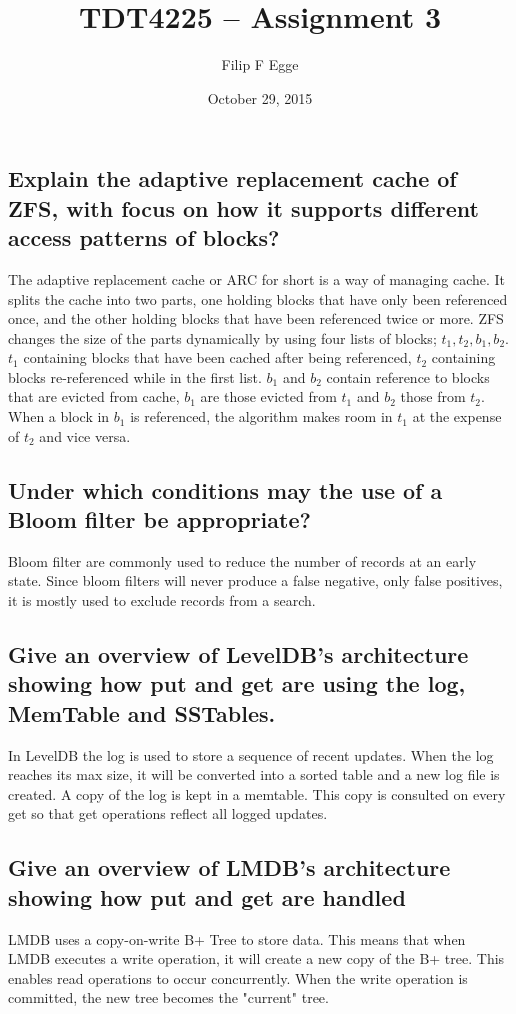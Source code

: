 \documentclass{article}
\begin{document}
 
\title{TDT4225 -- Assignment 3} 
\author{Filip F Egge}
\date{October 29, 2015} 
\maketitle

\newpage

\subsection*{Explain the adaptive replacement cache of ZFS, with focus on how
it supports different access patterns of blocks?} 
The adaptive replacement cache or ARC for short is a way of managing cache. It
splits the cache into two parts, one holding blocks that have only been
referenced once, and the other holding blocks that have been referenced twice or
more.  ZFS changes the size of the parts dynamically by using four lists of
blocks; $t_1, t_2, b_1, b_2$. $t_1$ containing blocks that have been cached
after being referenced, $t_2$ containing blocks re-referenced while in the first
list. $b_1$ and $b_2$ contain reference to blocks that are evicted from cache,
$b_1$ are those evicted from $t_1$ and $b_2$ those from $t_2$. When a block in
$b_1$ is referenced, the algorithm makes room in $t_1$ at the expense of $t_2$
and vice versa.

\subsection*{Under which conditions may the use of a Bloom filter be
appropriate?} Bloom filter are commonly used to reduce the number of records at
an early state. Since bloom filters will never produce a false negative, only
false positives, it is mostly used to exclude records from a search.

\subsection*{Give an overview of LevelDB's architecture showing how put and
get are using the log, MemTable and SSTables.} 
In LevelDB the log is used to store a sequence of recent updates. When the log
reaches its max size, it will be converted into a sorted table and a new log
file is created. A copy of the log is kept in a memtable. This copy is consulted
on every get so that get operations reflect all logged updates. 

\subsection*{Give an overview of LMDB's architecture showing how put and get
are handled}
LMDB uses a copy-on-write B+ Tree to store data. This means that when LMDB
executes a write operation, it will create a new copy of the B+ tree. This
enables read operations to occur concurrently. When the write operation is
committed, the new tree becomes the "current" tree.
\end{document}

